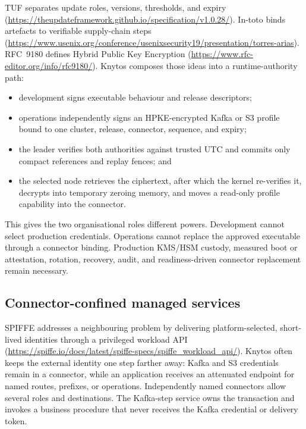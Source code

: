 TUF separates update roles, versions, thresholds, and expiry
(\url{https://theupdateframework.github.io/specification/v1.0.28/}). In-toto
binds artefacts to verifiable supply-chain steps
(\url{https://www.usenix.org/conference/usenixsecurity19/presentation/torres-arias}).
RFC~9180 defines Hybrid Public Key Encryption
(\url{https://www.rfc-editor.org/info/rfc9180/}). Knytos composes those
ideas into a runtime-authority path:

\begin{itemize}
    \item development signs executable behaviour and release descriptors;
    \item operations independently signs an HPKE-encrypted Kafka or S3 profile
        bound to one cluster, release, connector, sequence, and expiry;
    \item the leader verifies both authorities against trusted UTC and commits
        only compact references and replay fences; and
    \item the selected node retrieves the ciphertext, after which the kernel
        re-verifies it, decrypts into temporary zeroing memory, and moves a
        read-only profile capability into the connector.
\end{itemize}

This gives the two organisational roles different powers. Development cannot
select production credentials. Operations cannot replace the approved
executable through a connector binding. Production KMS/HSM custody, measured
boot or attestation, rotation, recovery, audit, and readiness-driven connector
replacement remain necessary.

\subsection{Connector-confined managed services}

SPIFFE addresses a neighbouring problem by delivering platform-selected,
short-lived identities through a privileged workload API
(\url{https://spiffe.io/docs/latest/spiffe-specs/spiffe_workload_api/}).
Knytos often keeps the external identity one step farther away: Kafka and
S3 credentials remain in a connector, while an application receives an
attenuated endpoint for named routes, prefixes, or operations. Independently
named connectors allow several roles and destinations. The Kafka-step service
owns the transaction and invokes a business procedure that never receives the
Kafka credential or delivery token.

